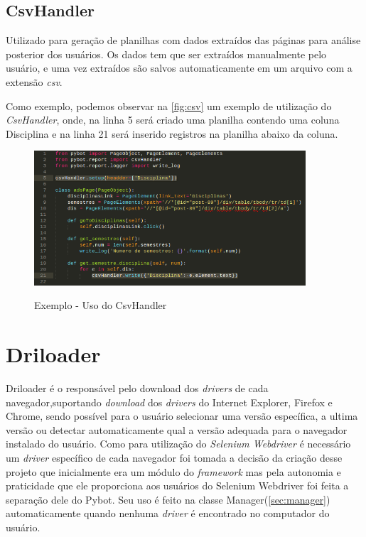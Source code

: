         \subsection{CsvHandler}
        Utilizado para geração de planilhas com dados extraídos das páginas para análise posterior dos usuários. Os dados tem que ser extraídos manualmente pelo
        usuário, e uma vez extraídos são salvos automaticamente em um arquivo com a extensão \emph{csv}.

        Como exemplo, podemos observar na \autoref{fig:csv} um exemplo de utilização do \emph{CsvHandler}, onde, na linha 5 será criado uma planilha contendo uma
        coluna Disciplina e na linha 21 será inserido registros na planilha abaixo da coluna.

        \begin{figure}[H]
            \vspace*{0,3cm}
            \centering
            \caption{Exemplo - Uso do CsvHandler}
            \includegraphics[width=0.9\textwidth]{./04-figuras/csv}
            \label{fig:csv}
        \end{figure}
        \vspace*{-0,9cm}
        {\raggedright {}}

    \section{Driloader}
    \label{driloader}
        Driloader é o responsável pelo download dos \textit{drivers} de cada navegador,suportando \textit{download} dos \textit{drivers} do Internet Explorer,
        Firefox e Chrome, sendo possível para o usuário selecionar uma versão específica, a ultima versão ou detectar automaticamente qual a versão adequada para o navegador
        instalado do usuário. Como para utilização do \emph{Selenium Webdriver} é necessário um \textit{driver} específico de cada navegador foi tomada a decisão da criação
        desse projeto que inicialmente era um módulo do \emph{framework} mas pela autonomia e praticidade que ele proporciona aos usuários do Selenium Webdriver foi feita a
        separação dele do Pybot. Seu uso é feito na classe Manager(\ref{sec:manager}) automaticamente quando nenhuma \emph{driver} é encontrado no computador do usuário.



